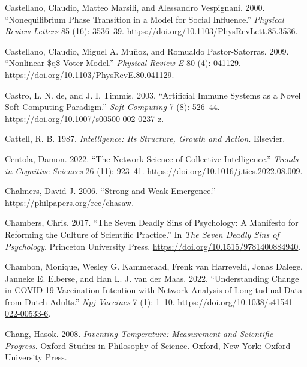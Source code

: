 \documentclass[
  a4paper,
  DIV=11,
  numbers=noendperiod,
  oneside]{scrreprt}
\newlength{\cslhangindent}
\newenvironment{CSLReferences}[2] %
 {\begin{list}{}{%
  \setlength{\itemindent}{0pt}
  \setlength{\leftmargin}{0pt}
  \setlength{\parsep}{0pt}
  \ifodd #1
   \setlength{\leftmargin}{\cslhangindent}
   \setlength{\itemindent}{-1\cslhangindent}
  \fi
  \setlength{\itemsep}{#2\baselineskip}}}
 {\end{list}}
\begin{document}
\begin{CSLReferences}{1}{0}
Castellano, Claudio, Matteo Marsili, and Alessandro Vespignani. 2000.
{``Nonequilibrium {Phase Transition} in a {Model} for {Social
Influence}.''} \emph{Physical Review Letters} 85 (16): 3536--39.
\url{https://doi.org/10.1103/PhysRevLett.85.3536}.

Castellano, Claudio, Miguel A. Muñoz, and Romualdo Pastor-Satorras.
2009. {``Nonlinear \$q\$-Voter Model.''} \emph{Physical Review E} 80
(4): 041129. \url{https://doi.org/10.1103/PhysRevE.80.041129}.

Castro, L. N. de, and J. I. Timmis. 2003. {``Artificial Immune Systems
as a Novel Soft Computing Paradigm.''} \emph{Soft Computing} 7 (8):
526--44. \url{https://doi.org/10.1007/s00500-002-0237-z}.

Cattell, R. B. 1987. \emph{Intelligence: {Its Structure}, {Growth} and
{Action}}. {Elsevier}.

Centola, Damon. 2022. {``The Network Science of Collective
Intelligence.''} \emph{Trends in Cognitive Sciences} 26 (11): 923--41.
\url{https://doi.org/10.1016/j.tics.2022.08.009}.

Chalmers, David J. 2006. {``Strong and Weak Emergence.''}
https://philpapers.org/rec/chasaw.

Chambers, Chris. 2017. {``The {Seven Deadly Sins} of {Psychology}: {A
Manifesto} for {Reforming} the {Culture} of {Scientific Practice}.''} In
\emph{The {Seven Deadly Sins} of {Psychology}}. {Princeton University
Press}. \url{https://doi.org/10.1515/9781400884940}.

Chambon, Monique, Wesley G. Kammeraad, Frenk van Harreveld, Jonas
Dalege, Janneke E. Elberse, and Han L. J. van der Maas. 2022.
{``Understanding Change in {COVID-19} Vaccination Intention with Network
Analysis of Longitudinal Data from {Dutch} Adults.''} \emph{Npj
Vaccines} 7 (1): 1--10.
\url{https://doi.org/10.1038/s41541-022-00533-6}.

Chang, Hasok. 2008. \emph{Inventing {Temperature}: {Measurement} and
{Scientific Progress}}. Oxford {Studies} in {Philosophy} of {Science}.
{Oxford, New York}: {Oxford University Press}.


\end{CSLReferences}
\end{document}
